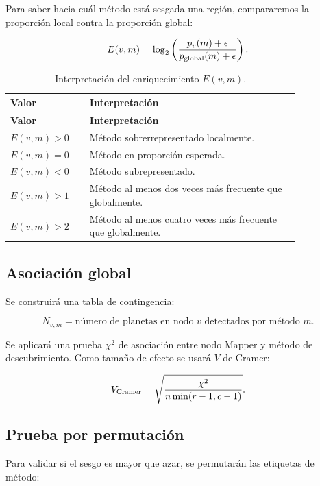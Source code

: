 \documentclass[11pt,letterpaper]{article}
\begin{document}
Para saber hacia cuál método está sesgada una región, compararemos la proporción local contra la proporción global:

\begin{equation}
E(v,m)=\log_2\left(\frac{p_v(m)+\epsilon}{p_{\rm global}(m)+\epsilon}\right).
\end{equation}

\begin{longtable}{p{0.22\linewidth}p{0.62\linewidth}}
\caption{Interpretación del enriquecimiento $E(v,m)$.}\\
\toprule
\textbf{Valor} & \textbf{Interpretación} \\
\midrule
\endfirsthead
\toprule
\textbf{Valor} & \textbf{Interpretación} \\
\midrule
\endhead
$E(v,m)>0$ & Método sobrerrepresentado localmente. \\
$E(v,m)=0$ & Método en proporción esperada. \\
$E(v,m)<0$ & Método subrepresentado. \\
$E(v,m)>1$ & Método al menos dos veces más frecuente que globalmente. \\
$E(v,m)>2$ & Método al menos cuatro veces más frecuente que globalmente. \\
\bottomrule
\end{longtable}

\subsection{Asociación global}

Se construirá una tabla de contingencia:

\begin{equation}
N_{v,m}=\text{número de planetas en nodo }v\text{ detectados por método }m.
\end{equation}

Se aplicará una prueba $\chi^2$ de asociación entre nodo Mapper y método de descubrimiento. Como tamaño de efecto se usará $V$ de Cramer:

\begin{equation}
V_{\rm Cramer}=\sqrt{\frac{\chi^2}{n\min(r-1,c-1)}}.
\end{equation}

\subsection{Prueba por permutación}

Para validar si el sesgo es mayor que azar, se permutarán las etiquetas de método:
\end{document}
